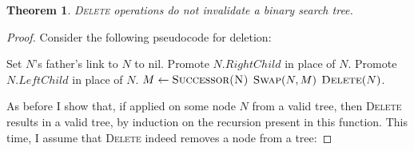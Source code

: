 \documentclass[a4paper,11pt]{scrartcl}
\newtheorem{theorem}{Theorem}
\begin{document}
\begin{theorem}
    \textsc{Delete} operations do not invalidate a binary search tree.
\end{theorem}
\begin{proof}
Consider the following pseudocode for deletion:

\begin{algorithmic}[1]
    \State Set $N$'s father's link to $N$ to nil.
    \State Promote $N.RightChild$ in place of $N$.
    \State Promote $N.LeftChild$ in place of $N$.
    \State $M \gets \textsc{Successor(N)}$
    \State $\textsc{Swap}(N, M)$
    \State $\textsc{Delete}(N)$.
\EndIf
\EndFunction
\end{algorithmic}

As before I show that, if applied on some node $N$ from a valid tree, then \textsc{Delete} results in a valid tree, by induction on the recursion present in this function. This time, I assume that \textsc{Delete} indeed removes a node from a tree:


\end{proof}
\end{document}
